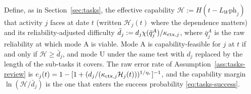 \begin{assumption}
\begin{enumerate}
\end{enumerate}
Define, as in Section~\ref{sec:tasks}, the effective capability $\mathcal H:=H(t-L_W\mathrm{ph}_j)$ that activity $j$ faces at date $t$ (written $\mathcal H_j(t)$ where the dependence matters) and its reliability-adjusted difficulty $\bar d_j:=d_j\chi(\bar q^A_j)/\kappa_{{\rm ctx},j}$, where $\bar q^A_j$ is the raw reliability at which mode A is viable. Mode A is capability-feasible for $j$ at $t$ if and only if $\mathcal H\ge\bar d_j$, and mode U under the same test with $d_j$ replaced by the length of the sub-tasks it covers. The raw error rate of Assumption~\ref{ass:tasks-review} is $e_j(t)=1-[1+(d_j/(\kappa_{{\rm ctx},j}\mathcal H_j(t)))^{1/\eta_r}]^{-1}$, and the capability margin $\ln(\mathcal H/\bar d_j)$ is the one that enters the success probability \eqref{eq:tasks-success}.
\end{assumption}

